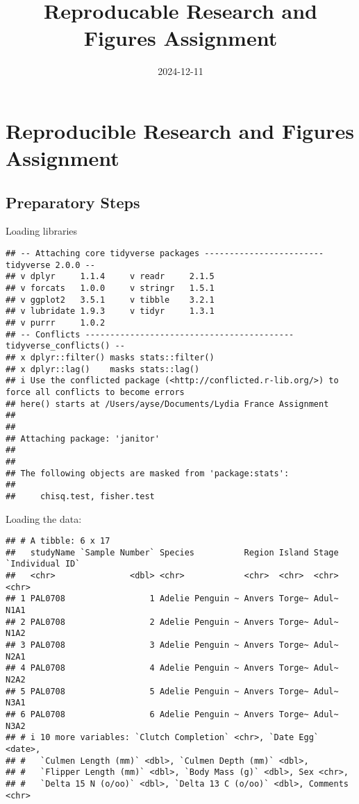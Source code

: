 \documentclass[
]{article}
\title{Reproducable Research and Figures Assignment}
\author{}
\date{\vspace{-2.5em}2024-12-11}
\begin{document}
\maketitle

\section{Reproducible Research and Figures
Assignment}\label{reproducible-research-and-figures-assignment}

\subsection{Preparatory Steps}\label{preparatory-steps}

Loading libraries

\begin{verbatim}
## -- Attaching core tidyverse packages ------------------------ tidyverse 2.0.0 --
## v dplyr     1.1.4     v readr     2.1.5
## v forcats   1.0.0     v stringr   1.5.1
## v ggplot2   3.5.1     v tibble    3.2.1
## v lubridate 1.9.3     v tidyr     1.3.1
## v purrr     1.0.2     
## -- Conflicts ------------------------------------------ tidyverse_conflicts() --
## x dplyr::filter() masks stats::filter()
## x dplyr::lag()    masks stats::lag()
## i Use the conflicted package (<http://conflicted.r-lib.org/>) to force all conflicts to become errors
## here() starts at /Users/ayse/Documents/Lydia France Assignment
## 
## 
## Attaching package: 'janitor'
## 
## 
## The following objects are masked from 'package:stats':
## 
##     chisq.test, fisher.test
\end{verbatim}

Loading the data:

\begin{verbatim}
## # A tibble: 6 x 17
##   studyName `Sample Number` Species          Region Island Stage `Individual ID`
##   <chr>               <dbl> <chr>            <chr>  <chr>  <chr> <chr>          
## 1 PAL0708                 1 Adelie Penguin ~ Anvers Torge~ Adul~ N1A1           
## 2 PAL0708                 2 Adelie Penguin ~ Anvers Torge~ Adul~ N1A2           
## 3 PAL0708                 3 Adelie Penguin ~ Anvers Torge~ Adul~ N2A1           
## 4 PAL0708                 4 Adelie Penguin ~ Anvers Torge~ Adul~ N2A2           
## 5 PAL0708                 5 Adelie Penguin ~ Anvers Torge~ Adul~ N3A1           
## 6 PAL0708                 6 Adelie Penguin ~ Anvers Torge~ Adul~ N3A2           
## # i 10 more variables: `Clutch Completion` <chr>, `Date Egg` <date>,
## #   `Culmen Length (mm)` <dbl>, `Culmen Depth (mm)` <dbl>,
## #   `Flipper Length (mm)` <dbl>, `Body Mass (g)` <dbl>, Sex <chr>,
## #   `Delta 15 N (o/oo)` <dbl>, `Delta 13 C (o/oo)` <dbl>, Comments <chr>
\end{verbatim}
\end{document}
